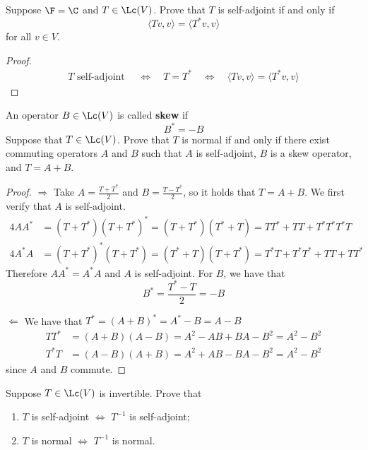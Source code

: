 \documentclass{extarticle}
\begin{document}
\begin{problem}{10}
    Suppose \(\F = \C\) and \(T \in \Lc(V)\). Prove that \(T\) is self-adjoint if and only if
    \[\langle Tv,v \rangle = \langle T^* v,v \rangle\]
    for all \(v \in V\).
\end{problem}

\begin{proof}
\begin{align*}
    T \text{ self-adjoint } \quad \Longleftrightarrow \quad
    T = T^* \quad \Longleftrightarrow \quad
    \langle Tv,v \rangle = \langle T^*v,v \rangle
\end{align*}
\end{proof}

\begin{problem}{12}
    An operator \(B \in \Lc(V)\) is called \textbf{skew} if
    \[B^* = - B\]
    Suppose that \(T \in \Lc(V)\). Prove that \(T\) is normal if and only if there exist commuting
    operators \(A\) and \(B\) such that \(A\) is self-adjoint, \(B\) is a skew operator, and
    \(T = A + B\).
\end{problem}

\begin{proof}
\(\Rightarrow\) Take \(A = \frac{T + T^*}{2}\) and \(B = \frac{T - T^*}{2}\), so it holds that
\(T = A + B\). We first verify that \(A\) is self-adjoint.
\begin{align*}
    4AA^* &= (T + T^*)(T + T^*)^* = (T + T^*)(T^* + T) = TT^* + TT + T^*T^* T^*T\\
    4A^*A &= (T + T^*)^* (T + T^*) = (T^* + T) (T + T^*) = T^*T + T^*T^* + TT + TT^*
\end{align*}
Therefore \(AA^* = A^*A\) and \(A\) is self-adjoint. For \(B\), we have that
\[B^* = \frac{T^* - T}{2} = - B\]

\(\Leftarrow\) We have that \(T^* = (A+B)^* = A^* - B = A - B\)
\begin{align*}
    TT^* &= (A+B)(A-B) = A^2 - AB + BA - B^2 = A^2 - B^2 \\
    T^*T &= (A - B)(A + B) = A^2 + AB - BA - B^2 = A^2 - B^2
\end{align*}
since \(A\) and \(B\) commute.
\end{proof}

\begin{problem}{15}
    Suppose \(T \in \Lc(V)\) is invertible. Prove that
    \begin{enumerate}[label=(\alph*)]
        \item \(T\) is self-adjoint \(\Longleftrightarrow\) \(T^{-1}\) is self-adjoint;
        \item \(T\) is normal \(\Longleftrightarrow\) \(T^{-1}\) is normal.
    \end{enumerate}
\end{problem}
\end{document}
